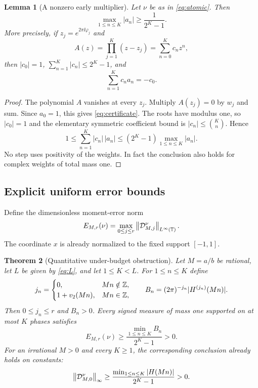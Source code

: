 \documentclass[11pt,a4paper]{article}
\numberwithin{equation}{section}
\newtheorem{theorem}{Theorem}[section]
\newtheorem{lemma}[theorem]{Lemma}
\theoremstyle{definition}
\theoremstyle{remark}
\newcommand{\T}{\mathbb T}\newcommand{\C}{\mathbb C}
\begin{document}
\begin{lemma}[A nonzero early multiplier]
\label{lem:annihilator}
Let $\nu$ be as in \eqref{eq:atomic}. Then
\begin{equation}
 \max_{1\le n\le K}|a_n|\ge\frac1{2^K-1}.
 \label{eq:early-multiplier}
\end{equation}
More precisely, if $z_j=e^{2\pi\ii\varphi_j}$ and
\begin{equation}
 A(z)=\prod_{j=1}^K(z-z_j)=\sum_{n=0}^Kc_nz^n,
 \label{eq:annihilator-polynomial}
\end{equation}
then $|c_0|=1$, $\sum_{n=1}^K|c_n|\le2^K-1$, and
\begin{equation}
 \sum_{n=1}^Kc_na_n=-c_0.
 \label{eq:certificate}
\end{equation}
\end{lemma}
\begin{proof}
The polynomial $A$ vanishes at every $z_j$. Multiply $A(z_j)=0$ by
$w_j$ and sum. Since $a_0=1$, this gives \eqref{eq:certificate}.
The roots have modulus one, so $|c_0|=1$ and the elementary symmetric
coefficient bound is $|c_n|\le\binom Kn$. Hence
\[
 1\le\sum_{n=1}^K|c_n|\,|a_n|
 \le(2^K-1)\max_{1\le n\le K}|a_n|.
\]
No step uses positivity of the weights. In fact the conclusion also
holds for complex weights of total mass one.
\end{proof}

\subsection{Explicit uniform error bounds}

Define the dimensionless moment-error norm
\begin{equation}
 E_{M,r}(\nu)=\max_{0\le j\le r}\norm{\Def^\nu_{M,j}}_{L^\infty(\T)}.
 \label{eq:errornorm}
\end{equation}
The coordinate $x$ is already normalized to the fixed support $[-1,1]$.

\begin{theorem}[Quantitative under-budget obstruction]
\label{thm:quant-obstruction}
Let $M=a/b$ be rational, let $L$ be given by \eqref{eq:L}, and let
$1\le K<L$. For $1\le n\le K$ define
\begin{equation}
 j_n=\begin{cases}
 0,&Mn\notin\mathbb Z,\\
 1+v_2(Mn),&Mn\in\mathbb Z,
 \end{cases}
 \qquad
 B_n=(2\pi)^{-j_n}|H^{(j_n)}(Mn)|.
 \label{eq:Bn}
\end{equation}
Then $0\le j_n\le r$ and $B_n>0$. Every signed measure of
mass one supported on at most $K$ phases satisfies
\begin{equation}
 \boxed{\quad
 E_{M,r}(\nu)\ge
 \frac{\min_{1\le n\le K}B_n}{2^K-1}>0.
 \quad}
 \label{eq:quant-obstruction}
\end{equation}
For an irrational $M>0$ and every $K\ge1$, the corresponding conclusion
already holds on constants:
\begin{equation}
 \left\lVert\mathcal D^\nu_{M,0}\right\rVert_\infty
 \ge\frac{\min_{1\le n\le K}|H(Mn)|}{2^K-1}>0.
 \label{eq:irrational-quant}
\end{equation}
\end{theorem}
\end{document}
